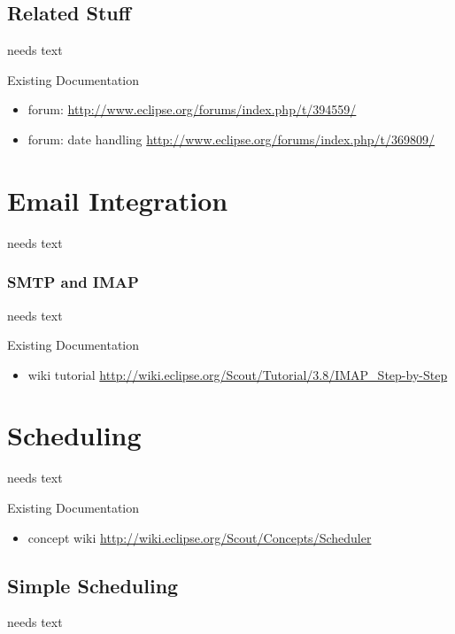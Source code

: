 \documentclass[a4paper,10pt,twoside]{book}
\begin{document}
\section{Related Stuff}
needs text

\noindent Existing Documentation
\begin{itemize}
  \item forum: \url{http://www.eclipse.org/forums/index.php/t/394559/}
  \item forum: date handling \url{http://www.eclipse.org/forums/index.php/t/369809/}
\end{itemize}

\chapter{Email Integration}
needs text

\subsection{SMTP and IMAP}
needs text

\noindent Existing Documentation
\begin{itemize}
  \item wiki tutorial \url{http://wiki.eclipse.org/Scout/Tutorial/3.8/IMAP_Step-by-Step}
  \end{itemize}

\chapter{Scheduling}
needs text

\noindent Existing Documentation
\begin{itemize}
  \item concept wiki \url{http://wiki.eclipse.org/Scout/Concepts/Scheduler}
\end{itemize}

\section{Simple Scheduling}
needs text

\end{document}
